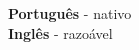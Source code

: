 \documentclass[9pt]{developercv} %
\begin{document}

\begin{minipage}[t]{0.3\textwidth}
    \vspace{-\baselineskip} %

    
    \textbf{Português} - nativo\\
    \textbf{Inglês} - razoável\\
\end{minipage}
    
    
    
    

\end{document}
